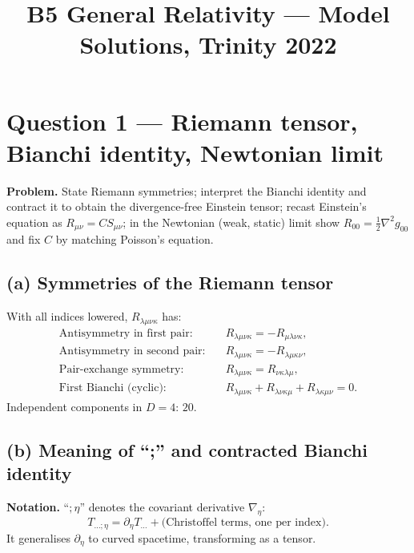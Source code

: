 \documentclass[11pt]{article}
\title{B5 General Relativity --- Model Solutions, Trinity 2022}
\author{}
\date{}
\newcommand{\Lap}{\nabla^{2}}
\begin{document}
\maketitle

\section*{Question 1 --- Riemann tensor, Bianchi identity, Newtonian limit}

\textbf{Problem.} State Riemann symmetries; interpret the Bianchi identity and contract it to obtain the divergence-free Einstein tensor; recast Einstein's equation as $R_{\mu\nu}=C S_{\mu\nu}$; in the Newtonian (weak, static) limit show $R_{00}=\tfrac12 \Lap g_{00}$ and fix $C$ by matching Poisson's equation.

\subsection*{(a) Symmetries of the Riemann tensor}

With all indices lowered, $R_{\lambda\mu\nu\kappa}$ has:
\begin{align*}
\text{Antisymmetry in first pair:}\quad & R_{\lambda\mu\nu\kappa}=-R_{\mu\lambda\nu\kappa},\\
\text{Antisymmetry in second pair:}\quad & R_{\lambda\mu\nu\kappa}=-R_{\lambda\mu\kappa\nu},\\
\text{Pair-exchange symmetry:}\quad & R_{\lambda\mu\nu\kappa}=R_{\nu\kappa\lambda\mu},\\
\text{First Bianchi (cyclic):}\quad & R_{\lambda\mu\nu\kappa}+R_{\lambda\nu\kappa\mu}+R_{\lambda\kappa\mu\nu}=0.
\end{align*}
Independent components in $D=4$: $20$.

\subsection*{(b) Meaning of ``;'' and contracted Bianchi identity}

\textbf{Notation.} ``$;\eta$'' denotes the covariant derivative $\nabla_\eta$:
\[ T_{\dots;\eta}=\partial_\eta T_{\dots}+\text{(Christoffel terms, one per index)}. \]
It generalises $\partial_\eta$ to curved spacetime, transforming as a tensor.
\end{document}
